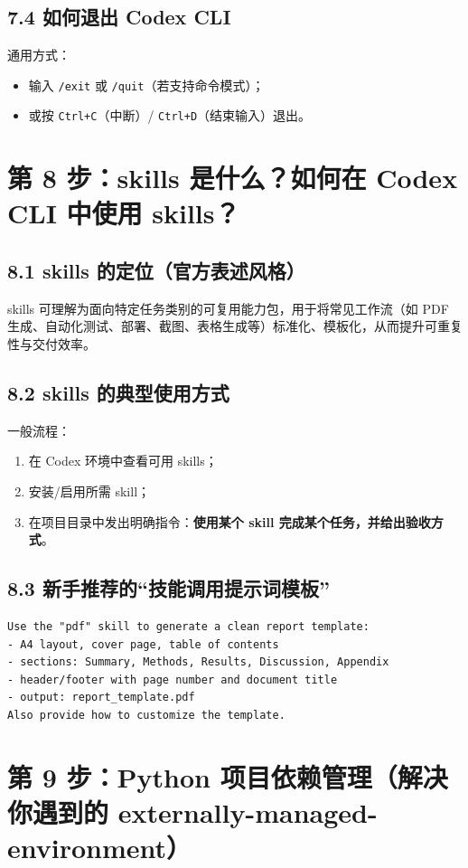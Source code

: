 \documentclass[11pt,a4paper]{article}
\begin{document}
\subsection{7.4 如何退出 Codex CLI}
通用方式：
\begin{itemize}[leftmargin=1.5em]
  \item 输入 \texttt{/exit} 或 \texttt{/quit}（若支持命令模式）；
  \item 或按 \texttt{Ctrl+C}（中断）/ \texttt{Ctrl+D}（结束输入）退出。
\end{itemize}

\section{第 8 步：skills 是什么？如何在 Codex CLI 中使用 skills？}
\subsection{8.1 skills 的定位（官方表述风格）}
skills 可理解为面向特定任务类别的可复用能力包，用于将常见工作流（如 PDF 生成、自动化测试、部署、截图、表格生成等）标准化、模板化，从而提升可重复性与交付效率。

\subsection{8.2 skills 的典型使用方式}
一般流程：
\begin{enumerate}[leftmargin=1.7em]
  \item 在 Codex 环境中查看可用 skills；
  \item 安装/启用所需 skill；
  \item 在项目目录中发出明确指令：\textbf{使用某个 skill 完成某个任务，并给出验收方式}。
\end{enumerate}

\subsection{8.3 新手推荐的“技能调用提示词模板”}
\begin{lstlisting}
Use the "pdf" skill to generate a clean report template:
- A4 layout, cover page, table of contents
- sections: Summary, Methods, Results, Discussion, Appendix
- header/footer with page number and document title
- output: report_template.pdf
Also provide how to customize the template.
\end{lstlisting}

\section{第 9 步：Python 项目依赖管理（解决你遇到的 externally-managed-environment）}
\end{document}
